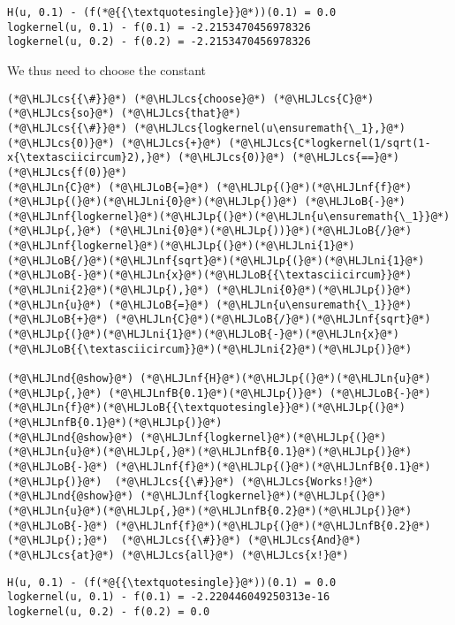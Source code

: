 \documentclass[12pt,a4paper]{article}
\newcommand{\HLJLn}[1]{#1}
\newcommand{\HLJLnd}[1]{\textcolor[RGB]{214,102,97}{#1}}
\newcommand{\HLJLnf}[1]{\textcolor[RGB]{66,102,213}{#1}}
\newcommand{\HLJLnfB}[1]{\textcolor[RGB]{59,151,46}{#1}}
\newcommand{\HLJLni}[1]{\textcolor[RGB]{59,151,46}{#1}}
\newcommand{\HLJLoB}[1]{\textcolor[RGB]{102,102,102}{\textbf{#1}}}
\newcommand{\HLJLp}[1]{#1}
\newcommand{\HLJLcs}[1]{\textcolor[RGB]{153,153,119}{\textit{#1}}}
\begin{document}
\begin{lstlisting}
H(u, 0.1) - (f(*@{{\textquotesingle}}@*))(0.1) = 0.0
logkernel(u, 0.1) - f(0.1) = -2.2153470456978326
logkernel(u, 0.2) - f(0.2) = -2.2153470456978326
\end{lstlisting}


We thus need to choose the constant


\begin{lstlisting}
(*@\HLJLcs{{\#}}@*) (*@\HLJLcs{choose}@*) (*@\HLJLcs{C}@*) (*@\HLJLcs{so}@*) (*@\HLJLcs{that}@*)
(*@\HLJLcs{{\#}}@*) (*@\HLJLcs{logkernel(u\ensuremath{\_1},}@*) (*@\HLJLcs{0)}@*) (*@\HLJLcs{+}@*) (*@\HLJLcs{C*logkernel(1/sqrt(1-x{\textasciicircum}2),}@*) (*@\HLJLcs{0)}@*) (*@\HLJLcs{==}@*) (*@\HLJLcs{f(0)}@*)
(*@\HLJLn{C}@*) (*@\HLJLoB{=}@*) (*@\HLJLp{(}@*)(*@\HLJLnf{f}@*)(*@\HLJLp{(}@*)(*@\HLJLni{0}@*)(*@\HLJLp{)}@*) (*@\HLJLoB{-}@*) (*@\HLJLnf{logkernel}@*)(*@\HLJLp{(}@*)(*@\HLJLn{u\ensuremath{\_1}}@*)(*@\HLJLp{,}@*) (*@\HLJLni{0}@*)(*@\HLJLp{))}@*)(*@\HLJLoB{/}@*)(*@\HLJLnf{logkernel}@*)(*@\HLJLp{(}@*)(*@\HLJLni{1}@*)(*@\HLJLoB{/}@*)(*@\HLJLnf{sqrt}@*)(*@\HLJLp{(}@*)(*@\HLJLni{1}@*)(*@\HLJLoB{-}@*)(*@\HLJLn{x}@*)(*@\HLJLoB{{\textasciicircum}}@*)(*@\HLJLni{2}@*)(*@\HLJLp{),}@*) (*@\HLJLni{0}@*)(*@\HLJLp{)}@*)
(*@\HLJLn{u}@*) (*@\HLJLoB{=}@*) (*@\HLJLn{u\ensuremath{\_1}}@*) (*@\HLJLoB{+}@*) (*@\HLJLn{C}@*)(*@\HLJLoB{/}@*)(*@\HLJLnf{sqrt}@*)(*@\HLJLp{(}@*)(*@\HLJLni{1}@*)(*@\HLJLoB{-}@*)(*@\HLJLn{x}@*)(*@\HLJLoB{{\textasciicircum}}@*)(*@\HLJLni{2}@*)(*@\HLJLp{)}@*)

(*@\HLJLnd{@show}@*) (*@\HLJLnf{H}@*)(*@\HLJLp{(}@*)(*@\HLJLn{u}@*)(*@\HLJLp{,}@*) (*@\HLJLnfB{0.1}@*)(*@\HLJLp{)}@*) (*@\HLJLoB{-}@*) (*@\HLJLn{f}@*)(*@\HLJLoB{{\textquotesingle}}@*)(*@\HLJLp{(}@*)(*@\HLJLnfB{0.1}@*)(*@\HLJLp{)}@*)
(*@\HLJLnd{@show}@*) (*@\HLJLnf{logkernel}@*)(*@\HLJLp{(}@*)(*@\HLJLn{u}@*)(*@\HLJLp{,}@*)(*@\HLJLnfB{0.1}@*)(*@\HLJLp{)}@*) (*@\HLJLoB{-}@*) (*@\HLJLnf{f}@*)(*@\HLJLp{(}@*)(*@\HLJLnfB{0.1}@*)(*@\HLJLp{)}@*)  (*@\HLJLcs{{\#}}@*) (*@\HLJLcs{Works!}@*)
(*@\HLJLnd{@show}@*) (*@\HLJLnf{logkernel}@*)(*@\HLJLp{(}@*)(*@\HLJLn{u}@*)(*@\HLJLp{,}@*)(*@\HLJLnfB{0.2}@*)(*@\HLJLp{)}@*) (*@\HLJLoB{-}@*) (*@\HLJLnf{f}@*)(*@\HLJLp{(}@*)(*@\HLJLnfB{0.2}@*)(*@\HLJLp{);}@*)  (*@\HLJLcs{{\#}}@*) (*@\HLJLcs{And}@*) (*@\HLJLcs{at}@*) (*@\HLJLcs{all}@*) (*@\HLJLcs{x!}@*)
\end{lstlisting}

\begin{lstlisting}
H(u, 0.1) - (f(*@{{\textquotesingle}}@*))(0.1) = 0.0
logkernel(u, 0.1) - f(0.1) = -2.220446049250313e-16
logkernel(u, 0.2) - f(0.2) = 0.0
\end{lstlisting}
\end{document}
